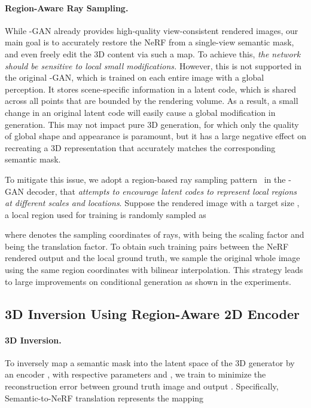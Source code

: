 \documentclass[runningheads]{llncs}
\begin{document}
\paragraph{\textbf{Region-Aware Ray Sampling.}} While -GAN already provides high-quality view-consistent rendered images, our main goal is to accurately restore the NeRF from a single-view semantic mask, and even freely edit the 3D content via such a map. To achieve this, \emph{the network should be sensitive to local small modifications.} However, this is not supported in the original -GAN, which is trained on each entire image with a global perception. It stores scene-specific information in a latent code, which is shared across all points that are bounded by the rendering volume. As a result, a small change in an original latent code will easily cause a global modification in generation. This may not impact pure 3D generation, for which only the quality of global shape and appearance is paramount, but it has a large negative effect on recreating a 3D representation that accurately matches the corresponding semantic mask.



To mitigate this issue, we adopt a region-based ray sampling pattern~\cite{schwarz2020graf,liu2022semantic} in the -GAN decoder, that \emph{attempts to encourage latent codes to represent local regions at different scales and locations}. Suppose the rendered image  with a target size , a local region  used for training is randomly sampled as

where  denotes the sampling coordinates of rays, with  being the scaling factor and  being the translation factor. To obtain such training pairs between the NeRF rendered output and the local ground truth, we sample the original whole image using the same region coordinates  with bilinear interpolation. This strategy leads to large improvements on conditional generation as shown in the experiments.


\subsection{3D Inversion Using Region-Aware 2D Encoder}\label{sec:method_enc}

\paragraph{\textbf{3D Inversion.}} To inversely map a semantic mask  into the  latent space of the 3D generator  by an encoder  , with respective parameters  and , we train  to minimize the reconstruction error between ground truth image  and output  . Specifically, Semantic-to-NeRF translation represents the mapping 
\end{document}
